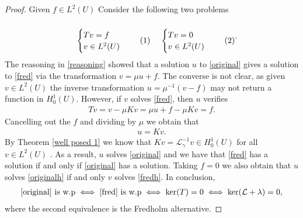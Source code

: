 \documentclass[
    a4paper,
    DIV=14,
    abstract=true,
    numbers=noenddot
]
{scrartcl}
\theoremstyle{definition}
\newcommand{\rm}[1]{\mathrm{#1}}
\newcommand{\Ll}{\mathcal{L}}
\begin{document}
\begin{proof}
    Given $f \in L^2(U)$  Consider the following two problems
    \begin{align}
        \begin{minipage}{0.3\linewidth}
            \begin{equation}
                \begin{cases}
                    Tv = f \\
                    v \in L^2(U)
                \end{cases}\label{fred}
            \end{equation}
        \end{minipage}%
        \begin{minipage}{0.3\linewidth}
            \begin{equation}
                \begin{cases}
                    Tv = 0 \\
                    v \in L^2(U)
                \end{cases}\label{fredh}
            \end{equation}
        \end{minipage}.
    \end{align}
    The reasoning in \eqref{reasoning} showed that a solution $u$ to \eqref{original} gives a solution to \eqref{fred} via the transformation $v=\mu u +f$. The converse is not clear, as given $v \in L^2(U)$  the inverse transformation $u = \mu ^{-1}(v-f)$ may not return a function in $H_0^1(U)$. However, if $v$  solves \eqref{fred}, then $u$ verifies
    \begin{align*}
        Tv=v-\mu K v=\mu u +f - \mu K v=f.
    \end{align*}
    Cancelling out the $f$ and dividing by $\mu$ we obtain that
    \begin{align*}
        u =Kv.
    \end{align*}
    By Theorem \ref{well posed 1} we know that $Kv = \Ll _\gamma ^{-1} v \in H_0^1(U)$ for all $v \in L^2(U)$ . As a result, $u$ solves \eqref{original} and   we have that \eqref{fred} has a solution if and only if \eqref{original} has a solution. Taking $f=0$ we also obtain that $u$ solves \eqref{originalh}  if and only  $v$  solves \eqref{fredh}. In conclusion,
    \begin{align*}
        \eqref{original} \text{ is } \rm{w.p} \iff \eqref{fred} \text{ is } \rm{w.p} \iff \ker(T) =0 \iff \ker(\Ll +\lambda )=0,
    \end{align*}
    where the second equivalence is the Fredholm alternative.


\end{proof}
\end{document}
